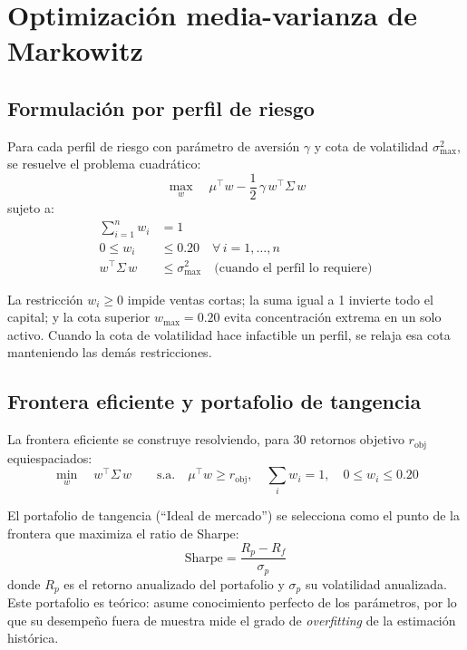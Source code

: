 \section{Optimizaci\'on media-varianza de Markowitz}

\subsection{Formulaci\'on por perfil de riesgo}

Para cada perfil de riesgo con par\'ametro de aversi\'on $\gamma$ y cota de
volatilidad $\sigma_{\max}^2$, se resuelve el problema cuadr\'atico:
\begin{equation}
\max_{w} \quad \mu^\top w - \frac{1}{2}\,\gamma\, w^\top \Sigma\, w
\end{equation}
sujeto a:
\begin{align}
\sum_{i=1}^{n} w_i &= 1 \\
0 \leq w_i &\leq 0.20 \quad \forall\, i = 1, \ldots, n \\
w^\top \Sigma\, w &\leq \sigma_{\max}^2
\quad \text{(cuando el perfil lo requiere)}
\end{align}

La restricci\'on $w_i \geq 0$ impide ventas cortas; la suma igual a 1
invierte todo el capital; y la cota superior $w_{\max} = 0.20$ evita
concentraci\'on extrema en un solo activo. Cuando la cota de volatilidad hace
infactible un perfil, se relaja esa cota manteniendo las dem\'as
restricciones.

\subsection{Frontera eficiente y portafolio de tangencia}

La frontera eficiente se construye resolviendo, para 30 retornos objetivo
$r_{\text{obj}}$ equiespaciados:
\begin{equation}
\min_{w} \quad w^\top \Sigma\, w \qquad \text{s.a.} \quad
\mu^\top w \geq r_{\text{obj}}, \quad
\sum_i w_i = 1, \quad
0 \leq w_i \leq 0.20
\end{equation}

El portafolio de tangencia (``Ideal de mercado'') se selecciona como el punto
de la frontera que maximiza el ratio de Sharpe:
\begin{equation}
\text{Sharpe} = \frac{R_p - R_f}{\sigma_p}
\end{equation}
donde $R_p$ es el retorno anualizado del portafolio y $\sigma_p$ su
volatilidad anualizada. Este portafolio es te\'orico: asume conocimiento
perfecto de los par\'ametros, por lo que su desempe\~no fuera de muestra mide
el grado de \textit{overfitting} de la estimaci\'on hist\'orica.

